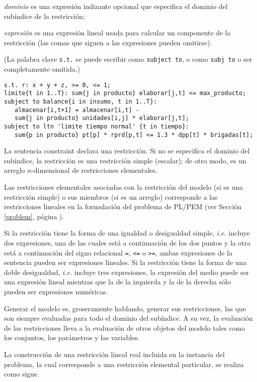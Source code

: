 \documentclass[11pt,spanish]{report}
\def\para#1{\noindent{\bf#1}}
\begin{document}
\noindent
{\it dominio} es una expresión indizante opcional que especifica el dominio del subíndice de la restricción;

\noindent
{\it expresión} es una expresión lineal usada para calcular un componente de la restricción (las comas que siguen a las expresiones pueden omitirse).

\noindent
(La palabra clave {\tt s.t.} se puede escribir como {\tt subject to}, o como {\tt subj to} o ser completamente omitida.)

\para{Ejemplos}

\begin{verbatim}
s.t. r: x + y + z, >= 0, <= 1;
limite{t in 1..T}: sum{j in producto} elaborar[j,t] <= max_producto;
subject to balance{i in insumo, t in 1..T}:
   almacenar[i,t+1] = almacenar[i,t] -
   sum{j in producto} unidades[i,j] * elaborar[j,t];
subject to ltn 'limite tiempo normal' {t in tiempo}:
   sum{p in producto} pt[p] * rprd[p,t] <= 1.3 * dpp[t] * brigadas[t];
\end{verbatim}

La sentencia constraint declara una restricción. Si no se especifica el dominio del subíndice, la restricción es una restricción simple (escalar); de otro modo, es un arreglo $n$-dimensional de restricciones elementales.

Las restricciones elementales asociadas con la restricción del modelo (si es una restricción simple) o sus miembros (si es un arreglo) corresponde a las restricciones lineales en la formulación del problema de PL/PEM (ver Sección \ref{problem}, página \pageref{problem}).

Si la restricción tiene la forma de una igualdad o desigualdad simple, {\it i.e.} incluye dos expresiones, una de las cuales está a continuación de los dos puntos y la otra está a continuación del signo relacional {\tt=}, {\tt<=} o {\tt>=}, ambas expresiones de la sentencia pueden ser expresiones lineales. Si la restricción tiene la forma de una doble desigualdad, {\it i.e.} incluye tres expresiones, la expresión del medio puede ser una expresión lineal mientras que la de la izquierda y la de la derecha sólo pueden ser expresiones numéricas.

Generar el modelo es, groseramente hablando, generar sus restricciones, las que son siempre evaluadas para todo el dominio del subíndice. A su vez, la evaluación de las restricciones lleva a la evaluación de otros objetos del modelo tales como los conjuntos, los parámetros y las variables.

La construcción de una restricción lineal real incluida en la instancia del problema, la cual corresponde a una restricción elemental particular, se realiza como sigue.
\end{document}
